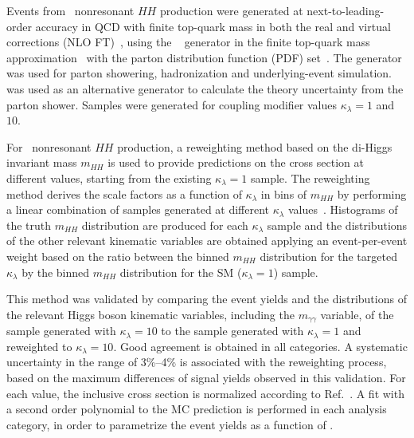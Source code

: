 \documentclass[PAPER, cernpreprint, texlive=2016, paper=a4, USenglish, texmf]{atlasdoc}
\begin{document}
Events from \ggF\ nonresonant $HH$ production were generated at next-to-leading-order accuracy in QCD with finite top-quark mass in both the real and virtual corrections (NLO FT)~\cite{Borowka:2016ehy}, using the \POWHEGBOX[v2]~\cite{Nason:2009ai} generator in the finite top-quark mass approximation~\cite{powheg-sm,powheg-kappa-lambda}  with the \PDFforLHC[15] parton distribution function (PDF) set~\cite{Butterworth:2015oua}.
The \PYTHIA[8.244]  generator was used for parton showering, hadronization and underlying-event simulation. \HERWIG[7.1.6] was used as an alternative generator to calculate the theory uncertainty from the parton shower.
Samples were generated for coupling modifier values $\kappa_\lambda = 1$ and $10$.
 
For \ggF\ nonresonant $HH$ production, a reweighting method based on the di-Higgs invariant mass $m_{HH}$ is used to provide predictions on the cross section at different \klambda{} values, starting from the existing $\kappa_\lambda = 1$ sample.
The reweighting method derives the scale factors as a function of $\kappa_\lambda$ in bins of $m_{HH}$ by performing a linear combination of samples generated at different $\kappa_\lambda$ values~\cite{ATL-PHYS-PUB-2019-007}. 
Histograms of the truth $m_{HH}$ distribution are produced for each $\kappa_{\lambda}$ sample and the distributions of the other relevant kinematic variables are obtained applying an event-per-event weight based on the ratio between the binned $m_{HH}$ distribution for the targeted $\kappa_{\lambda}$ by the binned $m_{HH}$ distribution for the SM ($\kappa_{\lambda} = 1$) sample.
 
This method was validated by comparing the event yields and the distributions of the relevant Higgs boson kinematic variables, including the $m_{\gamma \gamma}$ variable, of the sample generated with $\kappa_\lambda = 10$ to the sample generated with $\kappa_\lambda = 1$ and reweighted to $\kappa_\lambda = 10$. Good agreement is obtained in all categories. A systematic uncertainty in the range of 3\%--4\% is associated with the reweighting process, based on the maximum differences of signal yields observed in this validation. For each \klambda{} value, the inclusive cross section is normalized according to Ref.~\cite{Amoroso:2020lgh}. A fit with a second order polynomial to the MC prediction is performed in each analysis category, in order to parametrize the event yields as a function of \klambda{}.
 
\end{document}
